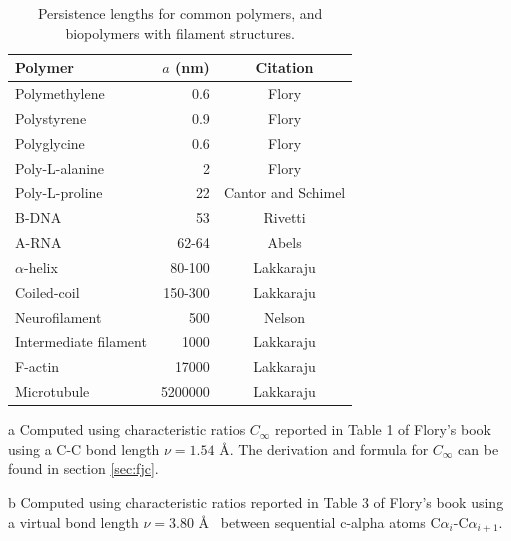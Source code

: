 \begin{table}[htbp]
\begin{center}
\begin{threeparttable}
\begin{tabular}{l|r|c}
\hline
Polymer               & $a$ (nm) & Citation  \\ \hline
Polymethylene         & 0.6      & Flory\tnote{a}      \\  
Polystyrene           & 0.9      & Flory\tnote{a}      \\
Polyglycine           & 0.6      & Flory \tnote{b}     \\
Poly-L-alanine        & 2        & Flory \tnote{b}     \\
Poly-L-proline        & 22       & Cantor and Schimel \cite{cantor1980} \\
B-DNA                 & 53       & Rivetti \cite{rivetti1996}     \\
A-RNA                 & 62-64    & Abels     \cite{abels2005}     \\
$\alpha$-helix        & 80-100   & Lakkaraju \cite{lakkaraju2009} \\
Coiled-coil           & 150-300  & Lakkaraju \cite{lakkaraju2009} \\
Neurofilament         & 500      & Nelson    \cite{nelson2004}    \\
Intermediate filament & 1000     & Lakkaraju \cite{lakkaraju2009} \\
F-actin               & 17000    & Lakkaraju \cite{lakkaraju2009} \\
Microtubule           & 5200000  & Lakkaraju \cite{lakkaraju2009} \\
\hline
\end{tabular}
\begin{tablenotes}
\item [a] Computed using  characteristic ratios $C_{\infty}$ reported in Table 1
  of Flory's book \cite{flory1969} using a C-C bond length $\nu = 1.54$
  \AA. The derivation and formula for $C_{\infty}$ can be found in section \ref{sec:fjc}.
\item [b] Computed using  characteristic ratios reported in Table 3
  of Flory's book \cite{flory1969} using a virtual bond length $\nu = 3.80$ \AA~
between sequential c-alpha atoms C${\alpha}_{i}$-C${\alpha}_{i+1}$.

\end{tablenotes}
\end{threeparttable}
\caption{Persistence lengths for common polymers, and biopolymers with
  filament structures.}
\label{tab:perval}
\end{center}
\end{table}

